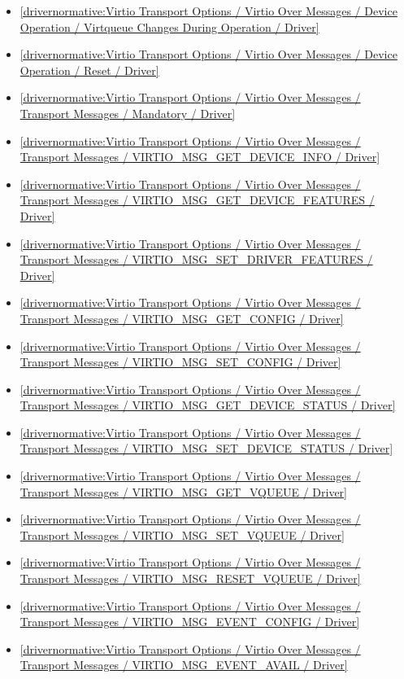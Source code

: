 \begin{itemize}
\item \ref{drivernormative:Virtio Transport Options / Virtio Over Messages / Device Operation / Virtqueue Changes During Operation / Driver}
\item \ref{drivernormative:Virtio Transport Options / Virtio Over Messages / Device Operation / Reset / Driver}
\item \ref{drivernormative:Virtio Transport Options / Virtio Over Messages / Transport Messages / Mandatory / Driver}
\item \ref{drivernormative:Virtio Transport Options / Virtio Over Messages / Transport Messages / VIRTIO_MSG_GET_DEVICE_INFO / Driver}
\item \ref{drivernormative:Virtio Transport Options / Virtio Over Messages / Transport Messages / VIRTIO_MSG_GET_DEVICE_FEATURES / Driver}
\item \ref{drivernormative:Virtio Transport Options / Virtio Over Messages / Transport Messages / VIRTIO_MSG_SET_DRIVER_FEATURES / Driver}
\item \ref{drivernormative:Virtio Transport Options / Virtio Over Messages / Transport Messages / VIRTIO_MSG_GET_CONFIG / Driver}
\item \ref{drivernormative:Virtio Transport Options / Virtio Over Messages / Transport Messages / VIRTIO_MSG_SET_CONFIG / Driver}
\item \ref{drivernormative:Virtio Transport Options / Virtio Over Messages / Transport Messages / VIRTIO_MSG_GET_DEVICE_STATUS / Driver}
\item \ref{drivernormative:Virtio Transport Options / Virtio Over Messages / Transport Messages / VIRTIO_MSG_SET_DEVICE_STATUS / Driver}
\item \ref{drivernormative:Virtio Transport Options / Virtio Over Messages / Transport Messages / VIRTIO_MSG_GET_VQUEUE / Driver}
\item \ref{drivernormative:Virtio Transport Options / Virtio Over Messages / Transport Messages / VIRTIO_MSG_SET_VQUEUE / Driver}
\item \ref{drivernormative:Virtio Transport Options / Virtio Over Messages / Transport Messages / VIRTIO_MSG_RESET_VQUEUE / Driver}
\item \ref{drivernormative:Virtio Transport Options / Virtio Over Messages / Transport Messages / VIRTIO_MSG_EVENT_CONFIG / Driver}
\item \ref{drivernormative:Virtio Transport Options / Virtio Over Messages / Transport Messages / VIRTIO_MSG_EVENT_AVAIL / Driver}
\end{itemize}

